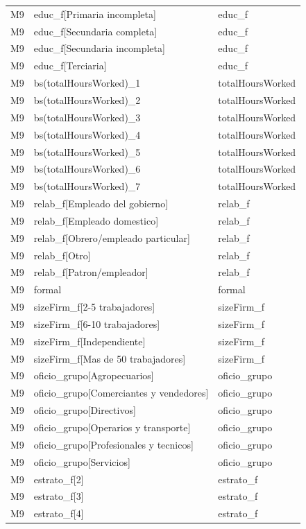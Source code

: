 \begin{longtable}{lll}
M9 & educ\_f[Primaria incompleta] & educ\_f \\
M9 & educ\_f[Secundaria completa] & educ\_f \\
M9 & educ\_f[Secundaria incompleta] & educ\_f \\
M9 & educ\_f[Terciaria] & educ\_f \\
M9 & bs(totalHoursWorked)\_1 & totalHoursWorked \\
M9 & bs(totalHoursWorked)\_2 & totalHoursWorked \\
M9 & bs(totalHoursWorked)\_3 & totalHoursWorked \\
M9 & bs(totalHoursWorked)\_4 & totalHoursWorked \\
M9 & bs(totalHoursWorked)\_5 & totalHoursWorked \\
M9 & bs(totalHoursWorked)\_6 & totalHoursWorked \\
M9 & bs(totalHoursWorked)\_7 & totalHoursWorked \\
M9 & relab\_f[Empleado del gobierno] & relab\_f \\
M9 & relab\_f[Empleado domestico] & relab\_f \\
M9 & relab\_f[Obrero/empleado particular] & relab\_f \\
M9 & relab\_f[Otro] & relab\_f \\
M9 & relab\_f[Patron/empleador] & relab\_f \\
M9 & formal & formal \\
M9 & sizeFirm\_f[2-5 trabajadores] & sizeFirm\_f \\
M9 & sizeFirm\_f[6-10 trabajadores] & sizeFirm\_f \\
M9 & sizeFirm\_f[Independiente] & sizeFirm\_f \\
M9 & sizeFirm\_f[Mas de 50 trabajadores] & sizeFirm\_f \\
M9 & oficio\_grupo[Agropecuarios] & oficio\_grupo \\
M9 & oficio\_grupo[Comerciantes y vendedores] & oficio\_grupo \\
M9 & oficio\_grupo[Directivos] & oficio\_grupo \\
M9 & oficio\_grupo[Operarios y transporte] & oficio\_grupo \\
M9 & oficio\_grupo[Profesionales y tecnicos] & oficio\_grupo \\
M9 & oficio\_grupo[Servicios] & oficio\_grupo \\
M9 & estrato\_f[2] & estrato\_f \\
M9 & estrato\_f[3] & estrato\_f \\
M9 & estrato\_f[4] & estrato\_f \\

\end{longtable}
